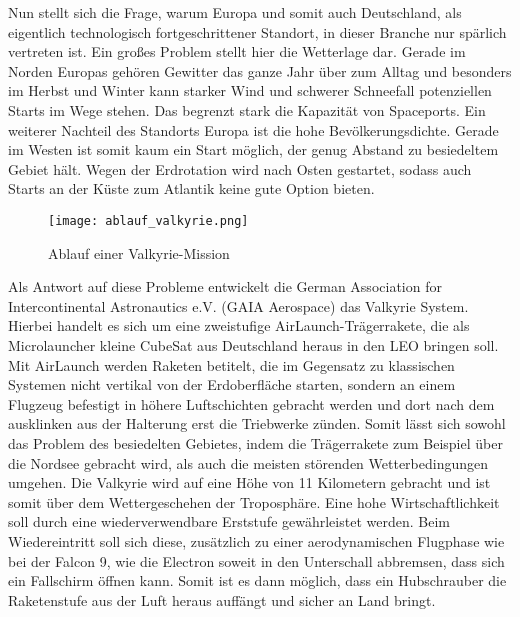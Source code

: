 Nun stellt sich die Frage, warum Europa und somit auch Deutschland, als eigentlich technologisch fortgeschrittener Standort, in dieser Branche nur spärlich vertreten ist. Ein großes Problem stellt hier die Wetterlage dar. Gerade im Norden Europas gehören Gewitter das ganze Jahr über zum Alltag und besonders im Herbst und Winter kann starker Wind und schwerer Schneefall potenziellen Starts im Wege stehen. Das begrenzt stark die Kapazität von Spaceports. Ein weiterer Nachteil des Standorts Europa ist die hohe Bevölkerungsdichte. Gerade im Westen ist somit kaum ein Start möglich, der genug Abstand zu besiedeltem Gebiet hält. Wegen der Erdrotation wird nach Osten gestartet, sodass auch Starts an der Küste zum Atlantik keine gute Option bieten.

\begin{figure}[h]
	\centering
	\texttt{[image: ablauf\_valkyrie.png]}
	\caption{Ablauf einer Valkyrie-Mission\cite{flugbahnBarz}}
\end{figure}

Als Antwort auf diese Probleme entwickelt die German Association for Intercontinental Astronautics e.V. (GAIA Aerospace) das Valkyrie System. Hierbei handelt es sich um eine zweistufige AirLaunch-Trägerrakete, die als Microlauncher kleine CubeSat aus Deutschland heraus in den LEO bringen soll\cite{GAIA}. Mit AirLaunch werden Raketen betitelt, die im Gegensatz zu klassischen Systemen nicht vertikal von der Erdoberfläche starten, sondern an einem Flugzeug befestigt in höhere Luftschichten gebracht werden und dort nach dem ausklinken aus der Halterung erst die Triebwerke zünden. Somit lässt sich sowohl das Problem des besiedelten Gebietes, indem die Trägerrakete zum Beispiel über die Nordsee gebracht wird, als auch die meisten störenden Wetterbedingungen umgehen. Die Valkyrie wird auf eine Höhe von 11 Kilometern gebracht\cite{flugbahnBarz} und ist somit über dem Wettergeschehen der Troposphäre. Eine hohe Wirtschaftlichkeit soll durch eine wiederverwendbare Erststufe gewährleistet werden. Beim Wiedereintritt soll sich diese, zusätzlich zu einer aerodynamischen Flugphase wie bei der Falcon 9, wie die Electron soweit in den Unterschall abbremsen, dass sich ein Fallschirm öffnen kann. Somit ist es dann möglich, dass ein Hubschrauber die Raketenstufe aus der Luft heraus auffängt und sicher an Land bringt.

